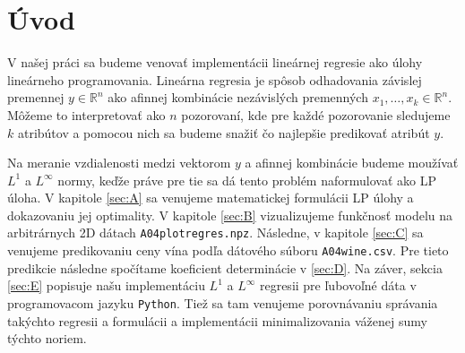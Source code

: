 \documentclass[report.tex]{subfiles}
\begin{document}
	
	\section{Úvod}	
	
	V našej práci sa budeme venovať implementácii lineárnej regresie ako úlohy lineárneho programovania. Lineárna regresia je spôsob odhadovania závislej premennej $y \in \mathbb{R}^n$ ako afinnej kombinácie nezávislých premenných $x_1,\dots,x_k \in \mathbb{R}^n$. Môžeme to interpretovať ako $n$ pozorovaní, kde pre každé pozorovanie sledujeme $k$ atribútov a pomocou nich sa budeme snažiť čo najlepšie predikovať atribút $y$.
	
	Na meranie vzdialenosti medzi vektorom $y$ a afinnej kombinácie budeme moužívať $L^1$ a $L^{\infty}$ normy, keďže práve pre tie sa dá tento problém naformulovať ako LP úloha. V kapitole \ref{sec:A} sa venujeme matematickej formulácii LP úlohy a dokazovaniu jej optimality. V kapitole \ref{sec:B} vizualizujeme funkčnosť modelu na arbitrárnych 2D dátach \verb|A04plotregres.npz|. Následne, v kapitole \ref{sec:C} sa venujeme predikovaniu ceny vína podľa dátového súboru \verb|A04wine.csv|. Pre tieto predikcie následne spočítame koeficient determinácie v \ref{sec:D}. Na záver, sekcia \ref{sec:E} popisuje našu implementáciu $L^1$ a $L^{\infty}$ regresii pre ľubovoľné dáta v programovacom jazyku \verb|Python|. Tiež sa tam venujeme porovnávaniu správania takýchto regresii a formulácii a implementácii minimalizovania váženej sumy týchto noriem.
	
\end{document}
